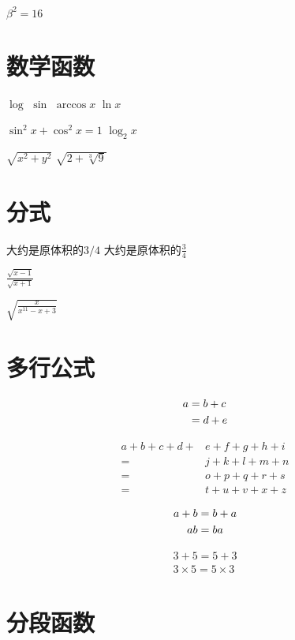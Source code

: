 \documentclass{article}
\begin{document}
    $\beta^2 = 16$

\section{数学函数}
    $\log$
    $\sin$
    $\arccos x$
    $\ln x$

    $\sin^2 x+\cos^2 x = 1$
    $\log_2 x$

    $\sqrt{x ^ 2 + y ^ 2}$
    $\sqrt{2 + \sqrt[3]{9}}$ %

\section{分式}
    大约是原体积的$3/4$
    大约是原体积的$\frac{3}{4}$

    $\frac{\sqrt{x-1}}{\sqrt{x+1}}$

    $\sqrt{\frac{x}{x^{11} - x + 3}}$



\section{多行公式}
    \begin{align} 
    a & = b + c \notag \\ 
    &=d+e 
    \end{align}
    
    \[
    \begin{aligned}  %
    a+b+c+d+& e+f+g+h+i \\
    =& j+k+l+m+n \\
    =& o+p+q+r+s \\ 
    =& t+u+v+x+z \end{aligned}
    \]

    \begin{gather}
    a+b=b+a \notag \\
    ab = ba    
    \end{gather}

    \begin{gather*}
    3+5=5+3 \\
    3 \times 5 = 5 \times 3
    \end{gather*}


\section{分段函数}
    
\end{document}
